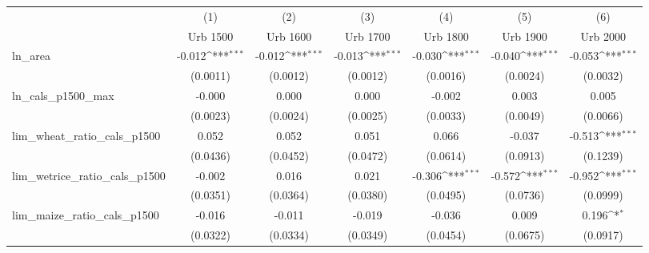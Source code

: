 {
\def\sym#1{\ifmmode^{#1}\else\(^{#1}\)\fi}
\begin{tabular}{l*{6}{c}}
\toprule
                    &\multicolumn{1}{c}{(1)}&\multicolumn{1}{c}{(2)}&\multicolumn{1}{c}{(3)}&\multicolumn{1}{c}{(4)}&\multicolumn{1}{c}{(5)}&\multicolumn{1}{c}{(6)}\\
                    &\multicolumn{1}{c}{Urb 1500}&\multicolumn{1}{c}{Urb 1600}&\multicolumn{1}{c}{Urb 1700}&\multicolumn{1}{c}{Urb 1800}&\multicolumn{1}{c}{Urb 1900}&\multicolumn{1}{c}{Urb 2000}\\
\midrule
ln\_area             &      -0.012\sym{***}&      -0.012\sym{***}&      -0.013\sym{***}&      -0.030\sym{***}&      -0.040\sym{***}&      -0.053\sym{***}\\
                    &    (0.0011)         &    (0.0012)         &    (0.0012)         &    (0.0016)         &    (0.0024)         &    (0.0032)         \\
\addlinespace
ln\_cals\_p1500\_max   &      -0.000         &       0.000         &       0.000         &      -0.002         &       0.003         &       0.005         \\
                    &    (0.0023)         &    (0.0024)         &    (0.0025)         &    (0.0033)         &    (0.0049)         &    (0.0066)         \\
\addlinespace
lim\_wheat\_ratio\_cals\_p1500&       0.052         &       0.052         &       0.051         &       0.066         &      -0.037         &      -0.513\sym{***}\\
                    &    (0.0436)         &    (0.0452)         &    (0.0472)         &    (0.0614)         &    (0.0913)         &    (0.1239)         \\
\addlinespace
lim\_wetrice\_ratio\_cals\_p1500&      -0.002         &       0.016         &       0.021         &      -0.306\sym{***}&      -0.572\sym{***}&      -0.952\sym{***}\\
                    &    (0.0351)         &    (0.0364)         &    (0.0380)         &    (0.0495)         &    (0.0736)         &    (0.0999)         \\
\addlinespace
lim\_maize\_ratio\_cals\_p1500&      -0.016         &      -0.011         &      -0.019         &      -0.036         &       0.009         &       0.196\sym{*}  \\
                    &    (0.0322)         &    (0.0334)         &    (0.0349)         &    (0.0454)         &    (0.0675)         &    (0.0917)         \\

\end{tabular}}
